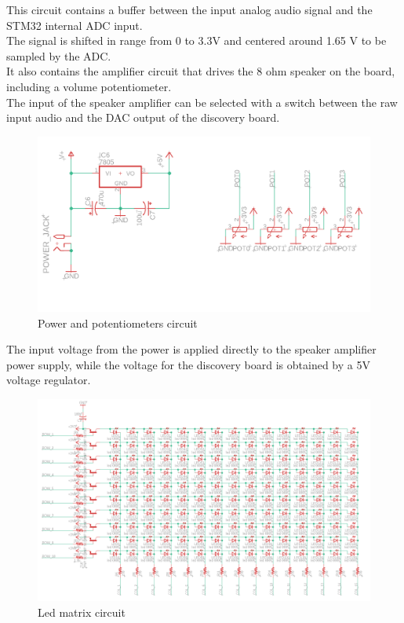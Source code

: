     This circuit contains a buffer between the input analog audio signal and the STM32 internal ADC input.\\
    The signal is shifted in range from 0 to 3.3V and centered around 1.65 V to be sampled by the ADC.\\
    It also contains the amplifier circuit that drives the 8 ohm speaker on the board, including a volume potentiometer. \\
    The input of the speaker amplifier can be selected with a switch between the raw input audio and the DAC output of the discovery board.
    
    \begin{figure}[H]
      \centering
        \includegraphics[width=\textwidth]{img/power.png}
        \caption{Power and potentiometers circuit}
    \end{figure}
    
    The input voltage from the power is applied directly to the speaker amplifier power supply, while the voltage for the discovery board is obtained by a 5V voltage regulator.
    
    \begin{figure}[H]
      \centering
        \includegraphics[width=\textwidth]{img/ledmatrix.png}
        \caption{Led matrix circuit}
    \end{figure}
    
